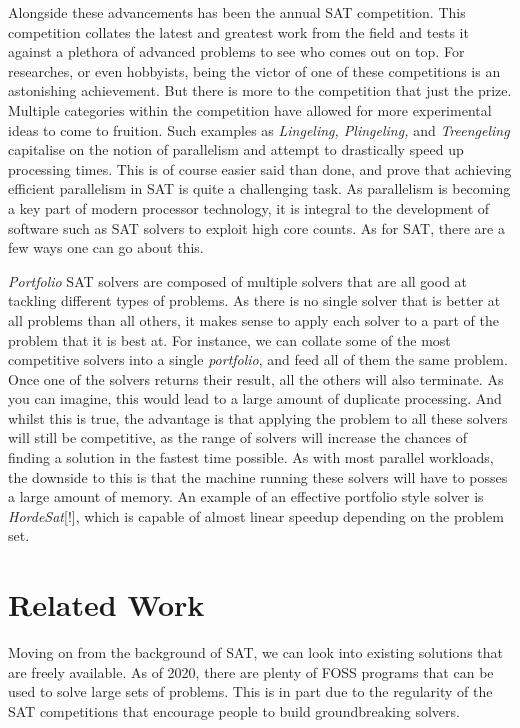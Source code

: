 \documentclass{article}
\begin{document}
Alongside these advancements has been the annual SAT competition. This competition collates the
latest and greatest work from the field and tests it against a plethora of advanced problems to see
who comes out on top. For researches, or even hobbyists, being the victor of one of these
competitions is an astonishing achievement. But there is more to the competition that just the
prize. Multiple categories within the competition have allowed for more experimental ideas to come
to fruition. Such examples as \textit{Lingeling, Plingeling,} and \textit{Treengeling} capitalise on
the notion of parallelism and attempt to drastically speed up processing times. This is of course
easier said than done, and prove that achieving efficient parallelism in SAT is quite a challenging
task. As parallelism is becoming a key part of modern processor technology, it is integral to the
development of software such as SAT solvers to exploit high core counts. As for SAT, there are a few
ways one can go about this.

\textit{Portfolio} SAT solvers are composed of multiple solvers that are all good at tackling
different types of problems. As there is no single solver that is better at all problems than all
others, it makes sense to apply each solver to a part of the problem that it is best at. For
instance, we can collate some of the most competitive solvers into a single \textit{portfolio}, and
feed all of them the same problem. Once one of the solvers returns their result, all the others will
also terminate. As you can imagine, this would lead to a large amount of duplicate processing. And
whilst this is true, the advantage is that applying the problem to all these solvers will still be
competitive, as the range of solvers will increase the chances of finding a solution in the fastest
time possible. As with most parallel workloads, the downside to this is that the machine running
these solvers will have to posses a large amount of memory. An example of an effective portfolio
style solver is \textit{HordeSat}[!], which is capable of almost linear speedup depending on the
problem set. %

\section{Related Work}
Moving on from the background of SAT, we can look into existing solutions that are freely available.
As of 2020, there are plenty of FOSS programs that can be used to solve large sets of problems. This
is in part due to the regularity of the SAT competitions that encourage people to build
groundbreaking solvers.
\end{document}

